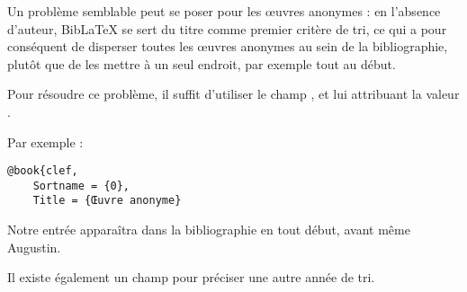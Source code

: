 Un problème semblable peut se poser pour les œuvres anonymes : en l'absence d'auteur, BibLaTeX se sert du titre comme premier critère de tri, ce qui a pour conséquent de disperser toutes les œuvres anonymes au sein de la bibliographie, plutôt que de les mettre à un seul endroit, par exemple tout au début.

Pour résoudre ce problème, il suffit d'utiliser le champ , et lui attribuant la valeur .

Par exemple :

\begin{verbatim}
@book{clef,
	Sortname = {0},
	Title = {Œuvre anonyme}
\end{verbatim}

Notre entrée  apparaîtra dans la bibliographie en tout début, avant même Augustin.

Il existe également un champ  pour préciser une autre année de tri. 